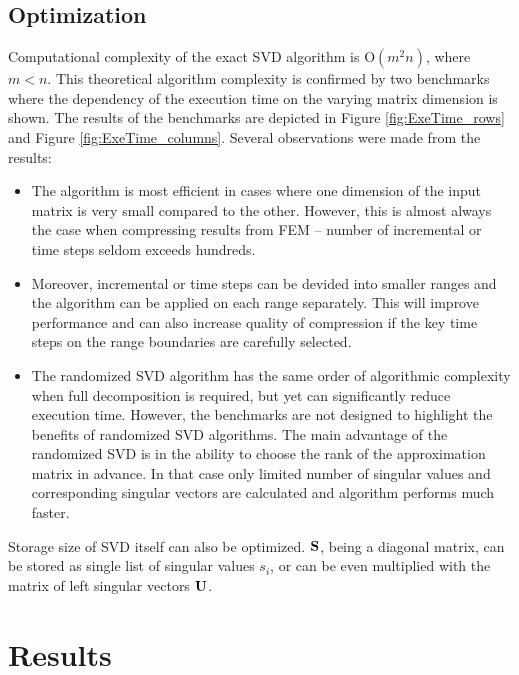 \subsection{Optimization}

Computational complexity of the exact SVD algorithm is $\mathrm{O}(m^2n)$, where $m<n$. This theoretical algorithm complexity is confirmed by two benchmarks where the dependency of the execution time on the varying matrix dimension is shown. The results of the benchmarks are depicted in Figure \ref{fig:ExeTime_rows} and Figure \ref{fig:ExeTime_columns}. Several observations were made from the results:

\begin{itemize}
\item The algorithm is most efficient in cases where one dimension of the input matrix is very small compared to the other. However, this is almost always the case when compressing results from FEM -- number of incremental or time steps seldom exceeds hundreds.
\item Moreover, incremental or time steps can be devided into smaller ranges and the algorithm can be applied on each range separately. This will improve performance and can also increase quality of compression if the key time steps on the range boundaries are carefully selected.
\item The randomized SVD algorithm has the same order of algorithmic complexity when full decomposition is required, but yet can significantly reduce execution time. However, the benchmarks are not designed to highlight the benefits of randomized SVD algorithms. The main advantage of the randomized SVD is in the ability to choose the rank of the approximation matrix in advance. In that case only limited number of singular values and corresponding singular vectors are calculated and algorithm performs much faster.
\end{itemize}

Storage size of SVD itself can also be optimized. $\mathbf{S}$, being a diagonal matrix, can be stored as single list of singular values $s_{i}$, or can be even multiplied with the matrix of left singular vectors $\mathbf{U}$.



\section{Results}

